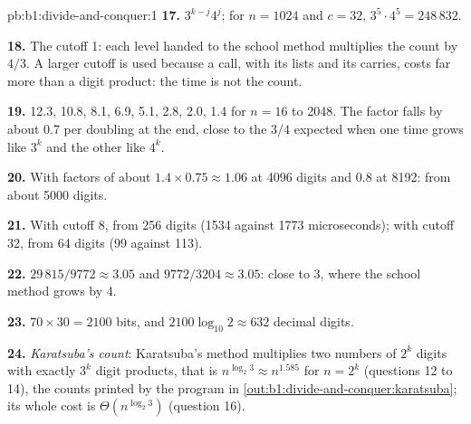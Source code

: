 \begin{solution}{pb:b1:divide-and-conquer:1}
\textbf{17.} $3^{k-j} 4^j$; for $n = 1024$ and $c = 32$, $3^5 \cdot 4^5 = 248\,832$.

\textbf{18.} The cutoff 1: each level handed to the school method multiplies the count by $4/3$. A larger cutoff is
used because a call, with its lists and its carries, costs far more than a digit product: the time is not the count.

\textbf{19.} 12.3, 10.8, 8.1, 6.9, 5.1, 2.8, 2.0, 1.4 for $n = 16$ to 2048. The factor falls by about 0.7 per doubling
at the end, close to the $3/4$ expected when one time grows like $3^k$ and the other like $4^k$.

\textbf{20.} With factors of about $1.4 \times 0.75 \approx 1.06$ at 4096 digits and 0.8 at 8192: from about 5000
digits.

\textbf{21.} With cutoff 8, from 256 digits (1534 against 1773 microseconds); with cutoff 32, from 64 digits (99 against
113).

\textbf{22.} $29\,815 / 9772 \approx 3.05$ and $9772 / 3204 \approx 3.05$: close to 3, where the school method grows by
4.

\textbf{23.} $70 \times 30 = 2100$ bits, and $2100 \log_{10} 2 \approx 632$ decimal digits.

\textbf{24.} \emph{Karatsuba's count}: Karatsuba's method multiplies two numbers of $2^k$ digits with exactly $3^k$
digit products, that is $n^{\log_2 3} \approx n^{1.585}$ for $n = 2^k$ (questions 12 to 14), the counts printed by the
program in \cref{out:b1:divide-and-conquer:karatsuba}; its whole cost is $\Theta(n^{\log_2 3})$ (question 16).
\end{solution}
